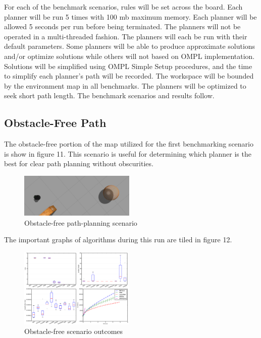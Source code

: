 \documentclass[conference]{IEEEtran} \usepackage[T1]{fontenc} \usepackage[backend=biber, style=ieee]{biblatex}
\begin{document}
For each of the benchmark scenarios, rules will be set across the board. Each planner will be run 5 times with 100 mb maximum memory. Each planner will be allowed 5 seconds 
per run before being terminated. The planners will not be operated in a multi-threaded fashion. The planners will each be run with their default parameters. Some planners 
will be able to produce approximate solutions and/or optimize solutions while others will not based on OMPL implementation. Solutions will be simplified using OMPL Simple 
Setup procedures, and the time to simplify each planner's path will be recorded. The workspace will be bounded by the environment map in all benchmarks. The planners 
will be optimized to seek short path length. The benchmark scenarios and results follow.

\subsection{Obstacle-Free Path} \label{Obstacle-free Path}

The obstacle-free portion of the map utilized for the first benchmarking scenario is show in figure 11. This scenario is useful for determining which planner is the
best for clear path planning without obscurities.

\begin{figure}
\label{figure11} 
\centering 
\includegraphics[width=0.49\textwidth]{scenario_1}
\caption{Obstacle-free path-planning scenario}
\end{figure}

The important graphs of algorithms during this run are tiled in figure 12. 

\begin{figure}
\label{figure12} 
\centering 
\includegraphics[width=0.49\textwidth]{s1_outcomes}
\caption{Obstacle-free scenario outcomes}
\end{figure}
\end{document}
